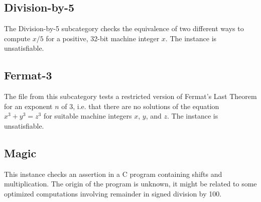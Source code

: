 \documentclass[conference]{IEEEtran}
\begin{document}


\subsection{Division-by-5}

The Division-by-5 subcategory checks the equivalence of
two different ways to compute $x/5$ for a positive, 32-bit machine integer $x$.
The instance is unsatisfiable.



\subsection{Fermat-3}

The file from this subcategory tests a restricted version of Fermat's Last Theorem
for an exponent $n$ of 3, i.e. that there are no solutions of the equation
$x^3 + y^3 = z^3$ for suitable machine integers $x$, $y$, and $z$.
The instance is unsatisfiable.

\noindent
\begin{minipage}[l]{\textwidth}

\end{minipage}

\balance
\subsection{Magic}

This instance checks an assertion in a C program containing shifts and multiplication.
The origin of the program is unknown, it might be related to some optimized computations
involving remainder in signed division by 100.




%
%
%
\end{document}
